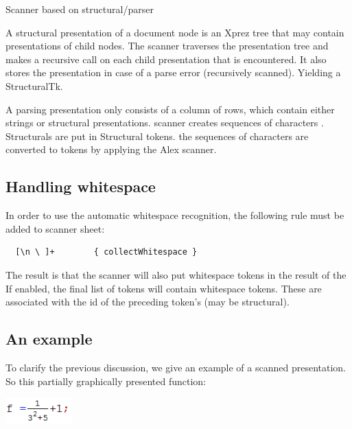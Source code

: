 \documentclass[12pt]{article}
\begin{document}
Scanner based on structural/parser



\noindent A structural presentation of a document node is an Xprez tree that may contain presentations of child nodes. The scanner traverses the presentation tree and makes a recursive call on each child presentation that is encountered. It also stores the presentation in case of a parse error (recursively scanned). Yielding a StructuralTk.


\noindent A parsing presentation only consists of a column of rows, which contain either strings or structural presentations. scanner creates sequences of characters . Structurals are put in Structural tokens. the sequences of characters are converted to tokens by applying the Alex scanner.


\subsection{Handling whitespace}

In order to use the automatic whitespace recognition, the following rule must be added to scanner sheet:

\begin{footnotesize}
\begin{verbatim}
  [\n \ ]+        { collectWhitespace }
\end{verbatim} %
\end{footnotesize}

The result is that the scanner will also put whitespace tokens in the result of the If enabled, the final list of tokens will contain whitespace tokens. These are associated with the id of the preceding token's (may be structural).


\subsection{An example}

To clarify the previous discussion, we give an example of a scanned presentation. So this partially graphically presented function:
\begin{center}
\includegraphics[width=1in]{images/fraction}
\end{center}
\end{document}
